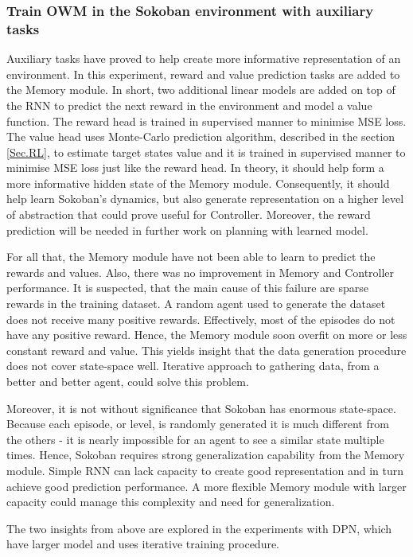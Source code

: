 \subsubsection{Train OWM in the Sokoban environment with auxiliary tasks}

Auxiliary tasks \cite{Algo.AuxiliaryTasks} have proved to help create more informative representation of an environment. In this experiment, reward and value prediction tasks are added to the Memory module. In short, two additional linear models are added on top of the RNN to predict the next reward in the environment and model a value function. The reward head is trained in supervised manner to minimise MSE loss. The value head uses Monte-Carlo prediction algorithm, described in the section \ref{Sec.RL}, to estimate target states value and it is trained in supervised manner to minimise MSE loss just like the reward head. In theory, it should help form a more informative hidden state of the Memory module. Consequently, it should help learn Sokoban’s dynamics, but also generate representation on a higher level of abstraction that could prove useful for Controller. Moreover, the reward prediction will be needed in further work on planning with learned model.

For all that, the Memory module have not been able to learn to predict the rewards and values. Also, there was no improvement in Memory and Controller performance. It is suspected, that the main cause of this failure are sparse rewards in the training dataset. A random agent used to generate the dataset does not receive many positive rewards. Effectively, most of the episodes do not have any positive reward. Hence, the Memory module soon overfit on more or less constant reward and value. 
This yields insight that the data generation procedure does not cover state-space well. Iterative approach to gathering data, from a better and better agent, could solve this problem.

Moreover, it is not without significance that Sokoban has enormous state-space. Because each episode, or level, is randomly generated it is much different from the others - it is nearly impossible for an agent to see a similar state multiple times. Hence, Sokoban requires strong generalization capability from the Memory module. Simple RNN can lack capacity to create good representation and in turn achieve good prediction performance. A more flexible Memory module with larger capacity could manage this complexity and need for generalization.

The two insights from above are explored in the experiments with DPN, which have larger model and uses iterative training procedure.

